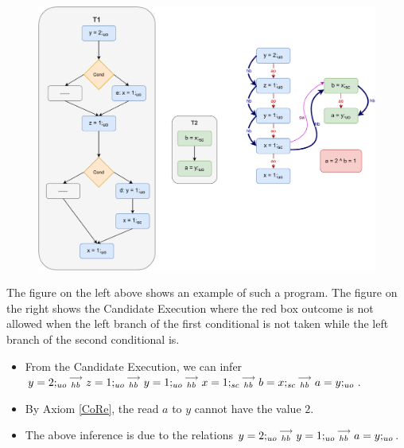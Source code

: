 
            \begin{figure}[H]
                \centering 
                \includegraphics[scale=0.7]{5.InstructionReordering/5.ValidReorderingProgram/CounterExamples3a(Conditionals).pdf}
                \caption{}
            \end{figure}
            The figure on the left above shows an example of such a program.  
            The figure on the right shows the Candidate Execution where the red box outcome is not allowed when the left branch of the first conditional is not taken while the left branch of the second conditional is.
            \begin{itemize}
                \item From the Candidate Execution, we can infer $y=2;_{uo}\stackrel{\longrightarrow}{_{hb}}z=1;_{uo}\stackrel{\longrightarrow}{_{hb}}y=1;_{uo}\stackrel{\longrightarrow}{_{hb}}x=1;_{sc}\stackrel{\longrightarrow}{_{hb}}b=x;_{sc}\stackrel{\longrightarrow}{_{hb}}a=y;_{uo}$.
                \item By Axiom \ref{CoRe}, the read $a$ to $y$ cannot have the value $2$. 
                \item The above inference is due to the relations $y=2;_{uo}\stackrel{\longrightarrow}{_{hb}}y=1;_{uo}\stackrel{\longrightarrow}{_{hb}}a=y;_{uo}$.
            \end{itemize}

